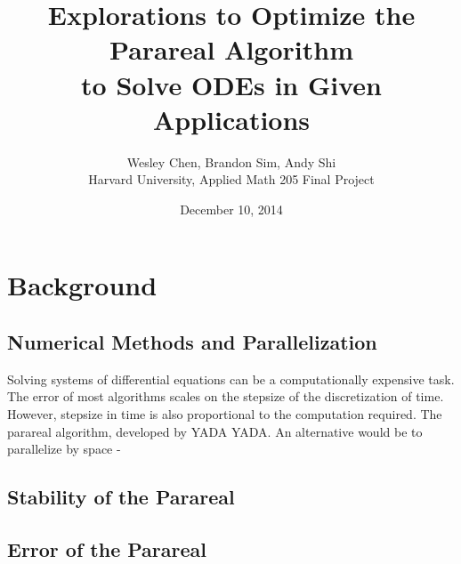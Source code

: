 \documentclass[letterpaper,twocolumn,11pt]{article}
\begin{document}
\title{Explorations to Optimize the Parareal Algorithm \\to Solve ODEs in Given Applications}
\author{Wesley Chen, Brandon Sim, Andy Shi \\
Harvard University, Applied Math 205 Final Project}
\date{December 10, 2014}

\setlength\parindent{0pt}

\setlength\parskip{2ex}

\section{Background}

\subsection{Numerical Methods and Parallelization}
Solving systems of differential equations can be a computationally expensive
task. The error of most algorithms scales on the stepsize of the discretization
of time. However, stepsize in time is also proportional to the computation
required. The parareal algorithm, developed by YADA YADA. An alternative would
be to parallelize by space - 

\subsection{Stability of the Parareal}

\subsection{Error of the Parareal}
\end{document}
